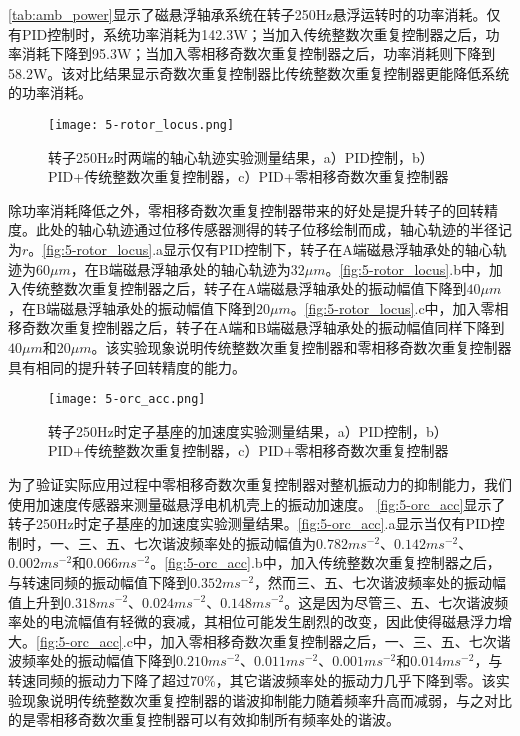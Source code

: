 \documentclass[
  lang=cn,
  degree=master,
  openany,oneside
]{nuaathesis}
\begin{document}
\autoref{tab:amb_power}显示了磁悬浮轴承系统在转子250Hz悬浮运转时的功率消耗。仅有PID控制时，系统功率消耗为142.3W；当加入传统整数次重复控制器之后，功率消耗下降到95.3W；当加入零相移奇数次重复控制器之后，功率消耗则下降到58.2W。该对比结果显示奇数次重复控制器比传统整数次重复控制器更能降低系统的功率消耗。

\begin{figure}[h!]
	\texttt{[image: 5-rotor\_locus.png]}
	\caption{转子250Hz时两端的轴心轨迹实验测量结果，a）PID控制，b）PID+传统整数次重复控制器，c）PID+零相移奇数次重复控制器}
	\label{fig:5-rotor_locus}
\end{figure}

除功率消耗降低之外，零相移奇数次重复控制器带来的好处是提升转子的回转精度。此处的轴心轨迹通过位移传感器测得的转子位移绘制而成，轴心轨迹的半径记为$r$。\autoref{fig:5-rotor_locus}.a显示仅有PID控制下，转子在A端磁悬浮轴承处的轴心轨迹为$60\mu m$，在B端磁悬浮轴承处的轴心轨迹为$32\mu m$。\autoref{fig:5-rotor_locus}.b中，加入传统整数次重复控制器之后，转子在A端磁悬浮轴承处的振动幅值下降到$40\mu m$，在B端磁悬浮轴承处的振动幅值下降到$20\mu m$。\autoref{fig:5-rotor_locus}.c中，加入零相移奇数次重复控制器之后，转子在A端和B端磁悬浮轴承处的振动幅值同样下降到$40\mu m$和$20\mu m$。该实验现象说明传统整数次重复控制器和零相移奇数次重复控制器具有相同的提升转子回转精度的能力。

\begin{figure}[h!]
	\texttt{[image: 5-orc\_acc.png]}
	\caption{转子250Hz时定子基座的加速度实验测量结果，a）PID控制，b）PID+传统整数次重复控制器，c）PID+零相移奇数次重复控制器}
	\label{fig:5-orc_acc}
\end{figure}

为了验证实际应用过程中零相移奇数次重复控制器对整机振动力的抑制能力，我们使用加速度传感器来测量磁悬浮电机机壳上的振动加速度。
\autoref{fig:5-orc_acc}显示了转子250Hz时定子基座的加速度实验测量结果。\autoref{fig:5-orc_acc}.a显示当仅有PID控制时，一、三、五、七次谐波频率处的振动幅值为$0.782ms^{-2}$、$0.142ms^{-2}$、$0.002ms^{-2}$和$0.066ms^{-2}$。\autoref{fig:5-orc_acc}.b中，加入传统整数次重复控制器之后，与转速同频的振动幅值下降到$0.352ms^{-2}$，然而三、五、七次谐波频率处的振动幅值上升到$0.318ms^{-2}$、$0.024ms^{-2}$、$0.148ms^{-2}$。这是因为尽管三、五、七次谐波频率处的电流幅值有轻微的衰减，其相位可能发生剧烈的改变，因此使得磁悬浮力增大。\autoref{fig:5-orc_acc}.c中，加入零相移奇数次重复控制器之后，一、三、五、七次谐波频率处的振动幅值下降到$0.210ms^{-2}$、$0.011ms^{-2}$、$0.001ms^{-2}$和$0.014ms^{-2}$，与转速同频的振动力下降了超过70\%，其它谐波频率处的振动力几乎下降到零。该实验现象说明传统整数次重复控制器的谐波抑制能力随着频率升高而减弱，与之对比的是零相移奇数次重复控制器可以有效抑制所有频率处的谐波。
\end{document}
